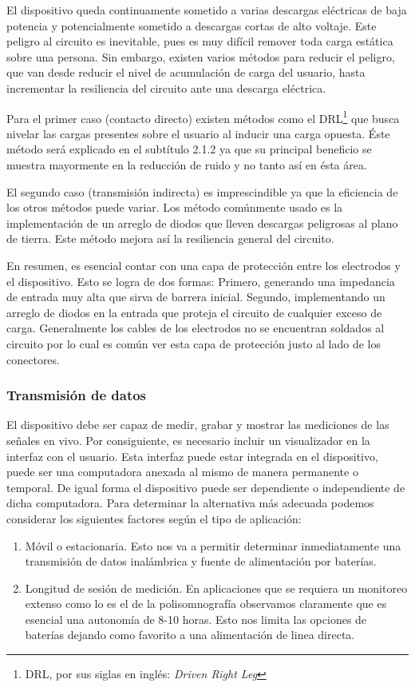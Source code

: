 El dispositivo queda continuamente sometido a varias descargas eléctricas de baja potencia y potencialmente sometido a descargas cortas de alto voltaje. Este peligro al circuito es inevitable, pues es muy difícil remover toda carga estática sobre una persona. Sin embargo, existen varios métodos para reducir el peligro, que van desde reducir el nivel de acumulación de carga del usuario, hasta incrementar la resiliencia del circuito ante una descarga eléctrica.

Para el primer caso (contacto directo) existen métodos como el DRL\footnote{DRL, por sus siglas en inglés: \emph{Driven Right Leg}} \cite{Winter1983} que busca nivelar las cargas presentes sobre el usuario al inducir una carga opuesta. Éste método será explicado en el subtítulo 2.1.2 ya que su principal beneficio se muestra mayormente en la reducción de ruido y no tanto así en ésta área.

El segundo caso (transmisión indirecta) es imprescindible ya que la eficiencia de los otros métodos puede variar. Los método comúnmente usado es la implementación de un arreglo de diodos que lleven descargas peligrosas al plano de tierra. Este método mejora así la resiliencia general del circuito. 

En resumen, es esencial contar con una capa de protección entre los electrodos y el dispositivo. Esto se logra de dos formas: Primero, generando una impedancia de entrada muy alta que sirva de barrera inicial. Segundo, implementando un arreglo de diodos en la entrada que proteja el circuito de cualquier exceso de carga. Generalmente los cables de los electrodos no se encuentran soldados al circuito por lo cual es común ver esta capa de protección justo al lado de los conectores.

\subsubsection{Transmisión de datos}
\label{sec:org15e0b5f}
El dispositivo debe ser capaz de medir, grabar y mostrar las mediciones de las señales en vivo. Por consiguiente, es necesario incluir un visualizador en la interfaz con el usuario. Esta interfaz puede estar integrada en el dispositivo, puede ser una computadora anexada al mismo de manera permanente o temporal. De igual forma el dispositivo puede ser dependiente o independiente de dicha computadora. Para determinar la alternativa más adecuada podemos considerar los siguientes factores según el tipo de aplicación:

\begin{enumerate}
\item Móvil o estacionaria. Esto nos va a permitir determinar inmediatamente una transmisión de datos inalámbrica y fuente de alimentación por baterías.
\item Longitud de sesión de medición. En aplicaciones que se requiera un monitoreo extenso como lo es el de la polisomnografía observamos claramente que es esencial una autonomía de 8-10 horas. Esto nos limita las opciones de baterías dejando como favorito a una alimentación de linea directa.
\end{enumerate}

